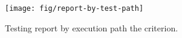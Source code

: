 \begin{figure}[!ht]
\begin{center}
\texttt{[image: fig/report-by-test-path]}
\caption{\label{fig:report-by-test-path} Testing report by
execution path \wrt the  criterion.}
\end{center}
\end{figure}
